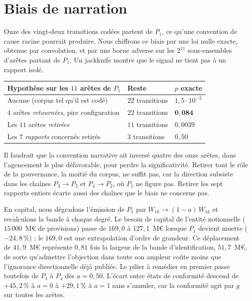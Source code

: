 \section{Biais de narration}
\label{sec:biais-narration}

Onze des vingt-deux transitions codées partent de $P_1$, ce qu'une convention de cause racine pourrait
produire. Nous chiffrons ce biais par une loi nulle exacte, obtenue par convolution, et par une borne
adverse sur les $2^{11}$ sous-ensembles d'arêtes partant de $P_1$. Un jackknife montre que le signal
ne tient pas à un rapport isolé.

\begin{center}\small
\renewcommand{\arraystretch}{1.25}
\begin{tabular}{@{}l l l@{}}
\toprule
\textbf{Hypothèse sur les $11$ arêtes de $P_1$} & \textbf{Reste} & $p$ \textbf{exacte} \\
\midrule
Aucune (corpus tel qu'il est codé) & $22$ transitions & $1{,}5\cdot10^{-5}$ \\
$4$ arêtes \emph{retournées}, pire configuration & $22$ transitions & $\mathbf{0{,}084}$ \\
Les $11$ arêtes \emph{retirées} & $11$ transitions & $0{,}0039$ \\
Les $7$ \emph{rapports} concernés retirés & $3$ transitions & $0{,}50$ \\
\bottomrule
\end{tabular}
\end{center}

\vspace{2pt}
\noindent Il faudrait que la convention narrative ait inversé quatre des onze arêtes, dans
l'agencement le plus défavorable, pour perdre la significativité. Retirer tout le rôle de la
gouvernance, la moitié du corpus, ne suffit pas, car la direction subsiste dans les chaînes
$P_3\to P_2$ et $P_4\to P_2$, où $P_1$ ne figure pas. Retirer les sept rapports entiers écarte aussi
des chaînes que le biais ne concerne pas.

En capital, nous dégradons l'émission de $P_1$ par $W_{1k}\to(1-a)\,W_{1k}$ et recalculons la bande
à chaque degré. Le besoin de capital de l'entité notionnelle ($15\,000$~M\euro{} de provisions) passe de $169{,}0$ à
$127{,}1$~M\euro{} lorsque $P_1$ devient muette ($-24{,}8\,\%$) ; le $169{,}0$ est une extrapolation d'ordre de grandeur. Ce déplacement de $41{,}9$~M\euro{} représente
$0{,}81$ fois la largeur de la bande d'identification, $51{,}7$~M\euro, de sorte qu'admettre
l'objection dans toute son ampleur coûte moins que l'ignorance directionnelle déjà publiée. Le pilier
à remédier en premier passe toutefois de $P_1$ à $P_4$ dès $a = 0{,}50$. L'écart entre états de
conformité descend de $+45{,}2\,\%$ à $a=0$ à $+29{,}1\,\%$ à $a=1$ sans s'annuler, car la
conformité agit par $g$ sur toutes les arêtes.

